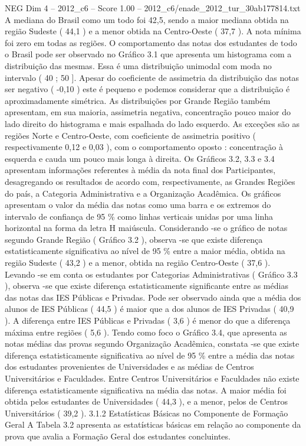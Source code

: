 \begin{textsample}{NEG Dim 4 – 2012\_c6 – Score 1.00 – 2012\_c6/enade\_2012\_tur\_30ab177814.txt}
A mediana do Brasil como um todo foi 42,5, sendo a maior mediana obtida na região Sudeste ( 44,1 ) e a menor obtida na Centro-Oeste ( 37,7 ).
A nota mínima foi zero em todas as regiões.
O comportamento das notas dos estudantes de todo o Brasil pode ser observado no Gráfico 3.1 que apresenta um histograma com a distribuição das mesmas.
Essa é uma distribuição unimodal com moda no intervalo ( 40 ; 50 ].
Apesar do coeficiente de assimetria da distribuição das notas ser negativo ( -0,10 ) este é pequeno e podemos considerar que a distribuição é aproximadamente simétrica.
As distribuições por Grande Região também apresentam, em sua maioria, assimetria negativa, concentração pouco maior do lado direito do histograma e mais espalhada do lado esquerdo.
As exceções são as regiões Norte e Centro-Oeste, com coeficiente de assimetria positivo ( respectivamente 0,12 e 0,03 ), com o comportamento oposto : concentração à esquerda e cauda um pouco mais longa à direita.
Os Gráficos 3.2, 3.3 e 3.4 apresentam informações referentes à média da nota final dos Participantes, desagregando os resultados de acordo com, respectivamente, as Grandes Regiões do país, a Categoria Administrativa e a Organização Acadêmica.
Os gráficos apresentam o valor da média das notas como uma barra e os extremos do intervalo de confiança de 95 \% como linhas verticais unidas por uma linha horizontal na forma da letra H maiúscula.
Considerando -se o gráfico de notas segundo Grande Região ( Gráfico 3.2 ), observa -se que existe diferença estatisticamente significativa ao nível de 95 \% entre a maior média, obtida na região Sudeste ( 43,2 ) e a menor, obtida na região Centro-Oeste ( 37,6 ).
Levando -se em conta os estudantes por Categorias Administrativas ( Gráfico 3.3 ), observa -se que existe diferença estatisticamente significante entre as médias das notas das IES Públicas e Privadas.
Pode ser observado ainda que a média dos alunos de IES Públicas ( 44,5 ) é maior que a dos alunos de IES Privadas ( 40,9 ).
A diferença entre IES Públicas e Privadas ( 3,6 ) é menor do que a diferença máxima entre regiões ( 5,6 ).
Tendo como foco o Gráfico 3.4, que apresenta as notas médias das provas segundo Organização Acadêmica, constata -se que existe diferença estatisticamente significativa ao nível de 95 \% entre a média das notas dos estudantes provenientes de Universidades e as médias de Centros Universitários e Faculdades.
Entre Centros Universitários e Faculdades não existe diferença estatisticamente significativa na média das notas.
A maior média foi obtida pelos estudantes de Universidades ( 44,3 ), e a menor, pelos de Centros Universitários ( 39,2 ). 3.1.2 Estatísticas Básicas no Componente de Formação Geral A Tabela 3.2 apresenta as estatísticas básicas em relação ao componente da prova que avalia a Formação Geral dos estudantes concluintes.

\end{textsample}
